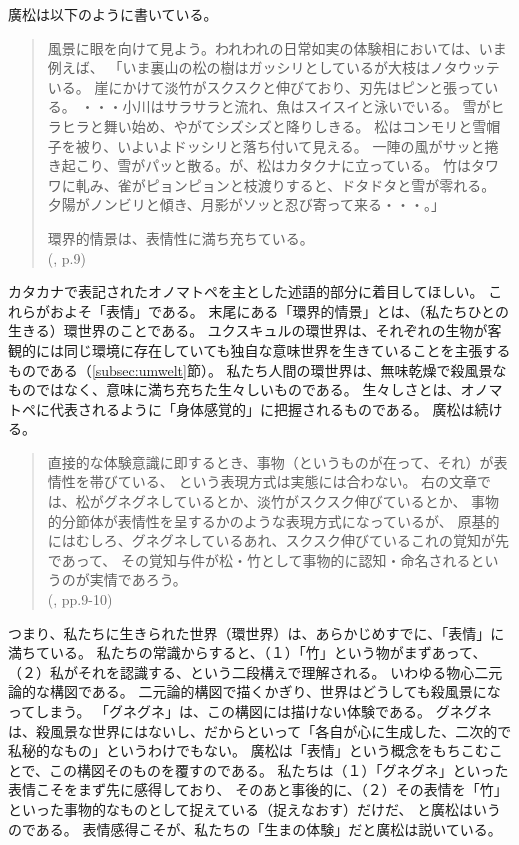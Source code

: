 廣松は以下のように書いている。
\begin{quotation}
  風景に眼を向けて見よう。われわれの日常如実の体験相においては、いま例えば、
  「いま裏山の松の樹はガッシリとしているが大枝はノタウッテいる。
  崖にかけて淡竹がスクスクと伸びており、刃先はピンと張っている。
  ・・・小川はサラサラと流れ、魚はスイスイと泳いでいる。
  雪がヒラヒラと舞い始め、やがてシズシズと降りしきる。
  松はコンモリと雪帽子を被り、いよいよドッシリと落ち付いて見える。
  一陣の風がサッと捲き起こり、雪がパッと散る。が、松はカタクナに立っている。
  竹はタワワに軋み、雀がピョンピョンと枝渡りすると、ドタドタと雪が零れる。
  夕陽がノンビリと傾き、月影がソッと忍び寄って来る・・・。」

  環界的情景は、表情性に満ち充ちている。\\
  (\cite{hiromatsu:1989}, p.9)
\end{quotation}
カタカナで表記されたオノマトペを主とした述語的部分に着目してほしい。
これらがおよそ「表情」である。
末尾にある「環界的情景」とは、（私たちひとの生きる）環世界\cite{uexkull:1934}のことである。
ユクスキュルの環世界\cite{uexkull:1934}は、それぞれの生物が客観的には同じ環境に存在していても独自な意味世界を生きていることを主張するものである（\ref{subsec:umwelt}節）。
私たち人間の環世界は、無味乾燥で殺風景なものではなく、意味に満ち充ちた生々しいものである。
生々しさとは、オノマトペに代表されるように「身体感覚的」に把握されるものである。
廣松は続ける。

\begin{quotation}
  直接的な体験意識に即するとき、事物（というものが在って、それ）が表情性を帯びている、 
  という表現方式は実態には合わない。
  右の文章では、松がグネグネしているとか、淡竹がスクスク伸びているとか、
  事物的分節体が表情性を呈するかのような表現方式になっているが、
  原基的にはむしろ、グネグネしているあれ、スクスク伸びているこれの覚知が先であって、
  その覚知与件が松・竹として事物的に認知・命名されるというのが実情であろう。 \\
  (\cite{hiromatsu:1989}, pp.9-10)
\end{quotation}
つまり、私たちに生きられた世界（環世界）は、あらかじめすでに、「表情」に満ちている。
私たちの常識からすると、（１）「竹」という物がまずあって、（２）私がそれを認識する、という二段構えで理解される。
いわゆる物心二元論的な構図である。
二元論的構図で描くかぎり、世界はどうしても殺風景になってしまう。
「グネグネ」は、この構図には描けない体験である。
グネグネは、殺風景な世界にはないし、だからといって「各自が心に生成した、二次的で私秘的なもの」というわけでもない。
廣松は「表情」という概念をもちこむことで、この構図そのものを覆すのである。
私たちは（１）「グネグネ」といった表情こそをまず先に感得しており、
そのあと事後的に、（２）その表情を「竹」といった事物的なものとして捉えている（捉えなおす）だけだ、
と廣松はいうのである。
表情感得こそが、私たちの「生まの体験」だと廣松は説いている。

